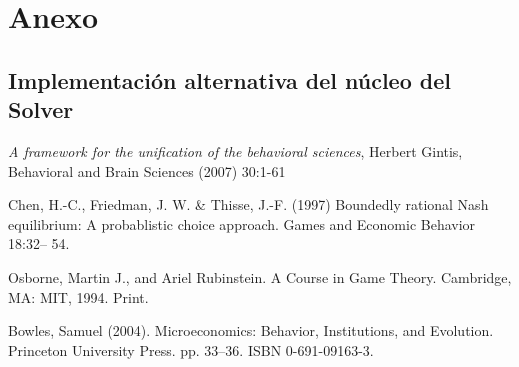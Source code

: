 \documentclass[10pt,a4paper,notitlepage,draft]{article}
\begin{document}
\section{Anexo}
\subsection{Implementación alternativa del núcleo del Solver}
\begin{thebibliography}{9}
   \emph{A framework for the unification of the behavioral sciences}, Herbert Gintis, Behavioral and Brain Sciences (2007) 30:1-61
  
   Chen, H.-C., Friedman, J. W. \& Thisse, J.-F. (1997) Boundedly rational Nash
equilibrium: A probablistic choice approach. Games and Economic Behavior
18:32– 54.

   Osborne, Martin J., and Ariel Rubinstein. A Course in Game Theory. Cambridge, MA: MIT, 1994. Print.

   Bowles, Samuel (2004). Microeconomics: Behavior, Institutions, and Evolution. Princeton University Press. pp. 33–36. ISBN 0-691-09163-3.
\end{thebibliography}
\end{document}
